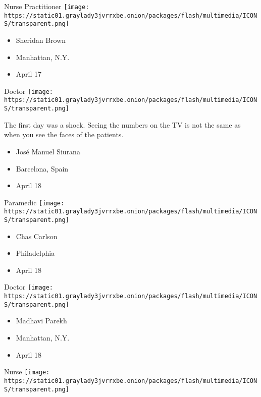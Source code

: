 \protect\hyperlink{item-sheridan-brown}{}

Nurse Practitioner
\texttt{[image: https://static01.graylady3jvrrxbe.onion/packages/flash/multimedia/ICONS/transparent.png]}

\begin{itemize}
\tightlist
\item
  Sheridan Brown
\item
  Manhattan, N.Y.
\item
  April 17
\end{itemize}

\protect\hyperlink{item-jose-manuel-siurana}{}

Doctor
\texttt{[image: https://static01.graylady3jvrrxbe.onion/packages/flash/multimedia/ICONS/transparent.png]}

The first day was a shock. Seeing the numbers on the TV is not the same
as when you see the faces of the patients.

\begin{itemize}
\tightlist
\item
  José Manuel Siurana
\item
  Barcelona, Spain
\item
  April 18
\end{itemize}

\protect\hyperlink{item-chas-carlson}{}

Paramedic
\texttt{[image: https://static01.graylady3jvrrxbe.onion/packages/flash/multimedia/ICONS/transparent.png]}

\begin{itemize}
\tightlist
\item
  Chas Carlson
\item
  Philadelphia
\item
  April 18
\end{itemize}

\protect\hyperlink{item-madhavi-parekh}{}

Doctor
\texttt{[image: https://static01.graylady3jvrrxbe.onion/packages/flash/multimedia/ICONS/transparent.png]}

\begin{itemize}
\tightlist
\item
  Madhavi Parekh
\item
  Manhattan, N.Y.
\item
  April 18
\end{itemize}

\protect\hyperlink{item-nicanor-baltazar}{}

Nurse
\texttt{[image: https://static01.graylady3jvrrxbe.onion/packages/flash/multimedia/ICONS/transparent.png]}

